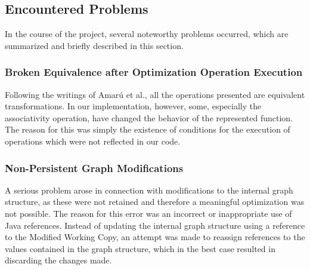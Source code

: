 \documentclass[
	accentcolor=1c,%
	type=intern,
	marginpar=false,
	ruledheaders=section,
	class=report,
	BCOR=5mm,
      parskip=half-,
	fontsize=10pt
	]{tudapub}
\begin{document}
{	\subsection{Encountered Problems}
		In the course of the project, several noteworthy problems occurred, which are summarized and briefly described in this section.
		\subsubsection{Broken Equivalence after Optimization Operation Execution}
			Following the writings of Amarú et al., all the operations presented are equivalent transformations.
			In our implementation, however, some, especially the associativity operation, have changed the behavior of the represented function.
			The reason for this was simply the existence of conditions for the execution of operations which were not reflected in our code.

		\subsubsection{Non-Persistent Graph Modifications}
			A serious problem arose in connection with modifications to the internal graph structure, as these were not retained and therefore a meaningful optimization was not possible.
			The reason for this error was an incorrect or inappropriate use of Java references.
			Instead of updating the internal graph structure using a reference to the Modified Working Copy, an attempt was made to reassign references to the values contained in the graph structure, which in the best case resulted in discarding the changes made.

%


}
\end{document}
